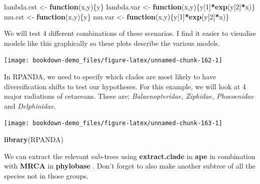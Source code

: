 \documentclass[
]{book}
\newenvironment{Shaded}{\begin{snugshade}}{\end{snugshade}}
\newcommand{\ControlFlowTok}[1]{\textcolor[rgb]{0.13,0.29,0.53}{\textbf{#1}}}
\newcommand{\DecValTok}[1]{\textcolor[rgb]{0.00,0.00,0.81}{#1}}
\newcommand{\KeywordTok}[1]{\textcolor[rgb]{0.13,0.29,0.53}{\textbf{#1}}}
\newcommand{\NormalTok}[1]{#1}
\newcommand{\OperatorTok}[1]{\textcolor[rgb]{0.81,0.36,0.00}{\textbf{#1}}}
\newcommand{\StringTok}[1]{\textcolor[rgb]{0.31,0.60,0.02}{#1}}
\begin{document}
\begin{Shaded}
\begin{Highlighting}[]
\NormalTok{lambda.cst \textless{}{-}}\StringTok{ }\ControlFlowTok{function}\NormalTok{(x,y)\{y\}}
\NormalTok{lambda.var \textless{}{-}}\StringTok{ }\ControlFlowTok{function}\NormalTok{(x,y)\{y[}\DecValTok{1}\NormalTok{]}\OperatorTok{*}\KeywordTok{exp}\NormalTok{(y[}\DecValTok{2}\NormalTok{]}\OperatorTok{*}\NormalTok{x)\}}
\NormalTok{mu.cst \textless{}{-}}\StringTok{ }\ControlFlowTok{function}\NormalTok{(x,y)\{y\}}
\NormalTok{mu.var \textless{}{-}}\StringTok{ }\ControlFlowTok{function}\NormalTok{(x,y)\{y[}\DecValTok{1}\NormalTok{]}\OperatorTok{*}\KeywordTok{exp}\NormalTok{(y[}\DecValTok{2}\NormalTok{]}\OperatorTok{*}\NormalTok{x)\}}
\end{Highlighting}
\end{Shaded}

We will test 4 different combinations of these scenarios. I find it easier to visualise models like this graphically so these plots describe the various models.

\begin{center}\texttt{[image: bookdown-demo\_files/figure-latex/unnamed-chunk-162-1]} \end{center}

In RPANDA, we need to specify which clades are most likely to have diversification shifts to test our hypotheses. For this example, we will look at 4 major radiations of cetaceans. These are; \emph{Balaenopteridae, Ziphidae, Phocoenidae} and \emph{Delphinidae}.

\begin{center}\texttt{[image: bookdown-demo\_files/figure-latex/unnamed-chunk-163-1]} \end{center}

\begin{Shaded}
\begin{Highlighting}[]
\KeywordTok{library}\NormalTok{(RPANDA)}
\end{Highlighting}
\end{Shaded}

We can extract the relevant sub-trees using \textbf{extract.clade} in \textbf{ape} \citep{ape} in combination with \textbf{MRCA} in \textbf{phylobase} \citep{phylobase}. Don't forget to also make another subtree of all the species not in those groups.
\end{document}

